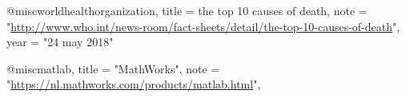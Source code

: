 @misc{worldhealthorganization,
	title  = {the top 10 causes of death},
	note =  "\url{http://www.who.int/news-room/fact-sheets/detail/the-top-10-causes-of-death}",
	year   = "24 may 2018"
}


@misc{matlab,
	title  = "MathWorks",
	note =  "\url{https://nl.mathworks.com/products/matlab.html}",
}



